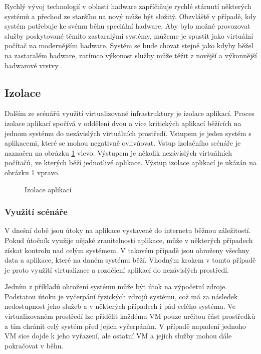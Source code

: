 Rychlý vývoj technologií v oblasti hadware zapříčiňuje rychlé stárnutí některých systémů a přechod ze staršího na nový může být složitý. Obzvláště v případě, kdy systém potřebuje ke svému běhu speciální hadware.
Aby bylo možné provozovat služby poskytované těmito zastaralými systémy, můžeme je spustit jako virtuální počítač na modernějším hadware. Systém se bude chovat stejně jako kdyby běžel na zastaralém hadware, zatímco
výkonost služby může těžit z novější a výkonnější hadwarové vrstvy  \cite{reasons}.

\subsection{Izolace}

Dalším ze scénářů využití virtualizované infrastruktury je izolace aplikací. Proces izolace aplikací spočívá v oddělení dvou a více kritických aplikací běžících na jednom systému do nezávislých virtuálních prostředí.
Vstupem je jeden systém s aplikacemi, které se mohou negativně ovlivňovat. Vstup izolačního scénáře je naznačen na obrázku \ref{izolation} vlevo. Výstupem je několik nezávislých virtuálních počítačů, ve kterých běží
jednotlivé aplikace. Výstup izolace aplikací je ukázán na obrázku \ref{izolation} vpravo.

\begin{figure}
    \centering    
    \caption{Izolace aplikací}
    \label{izolation}
\end{figure}

\subsubsection*{Využití scénáře}

V dnešní době jsou útoky na aplikace vystavené do internetu běžnou záležitostí. Pokud útočník využije nějaké zranitelnosti aplikace, může v některých případech získat kontrolu nad celým systémem. V takovém případě jsou
ohroženy všechny data a aplikace, které na daném systému běží. Vhodným krokem v tomto případě je proto využití virtualizace a rozdělení aplikací do nezávislých prostředí.

Jedním z příkladů ohrožení systému může být útok na výpočetní zdroje. Podstatou útoku je vyčerpání fyzických zdrojů systému, což má za následek nedostupnost jeho služeb a v některých případech i pád celého systému.
Ve virtualizovaném prostředí lze přidělit každému VM pouze určitou část prostředků a tím chránit celý systém před jejich vyčerpáním. V případě napadení jednoho VM sice dojde k jeho vyřazení, ale ostatní VM a jejich služby
mohou dále pokračovat v běhu.

